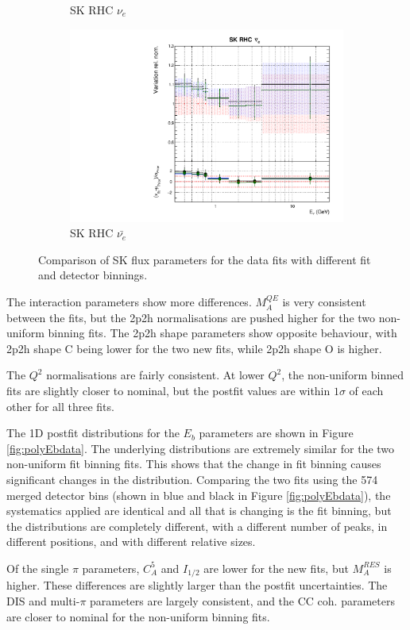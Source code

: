 \begin{figure}
\begin{subfigure}{0.45\textwidth}
  \caption{SK RHC $\nu_{e}$}
\end{subfigure}
\begin{subfigure}{0.45\textwidth}
  \centering
  \includegraphics[width=0.75\linewidth]{figs/polydataflux_15}
  \caption{SK RHC $\bar{\nu_e}$}
\end{subfigure}
\caption{Comparison of SK flux parameters for the data fits with different fit and detector binnings.}
\label{fig:polydatafluxSK}
\end{figure}

The interaction parameters show more differences. $M_A^{QE}$ is very consistent between the fits, but the 2p2h normalisations are pushed higher for the two non-uniform binning fits. The 2p2h shape parameters show opposite behaviour, with 2p2h shape C being lower for the two new fits, while 2p2h shape O is higher.

The $Q^2$ normalisations are fairly consistent. At lower $Q^2$, the non-uniform binned fits are slightly closer to nominal, but the postfit values are within $1\sigma$ of each other for all three fits. 

The 1D postfit distributions for the $E_b$ parameters are shown in Figure \ref{fig:polyEbdata}. The underlying distributions are extremely similar for the two non-uniform fit binning fits. This shows that the change in fit binning causes significant changes in the distribution. Comparing the two fits using the 574 merged detector bins (shown in blue and black in Figure \ref{fig:polyEbdata}), the systematics applied are identical and all that is changing is the fit binning, but the distributions are completely different, with a different number of peaks, in different positions, and with different relative sizes. 

Of the single $\pi$ parameters, $C_A^{5}$ and $I_{1/2}$ are lower for the new fits, but $M_A^{RES}$ is higher. These differences are slightly larger than the postfit uncertainties. The DIS and multi-$\pi$ parameters are largely consistent, and the CC coh. parameters are closer to nominal for the non-uniform binning fits.

